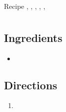 Recipe
  , 
  , 
  , 
  , 
  , 

\section{ }

\subsection{ Ingredients }

\begin{itemize}
  \item 
\end{itemize}

\subsection{ Directions }

\begin{enumerate}
  \item 
\end{enumerate}

